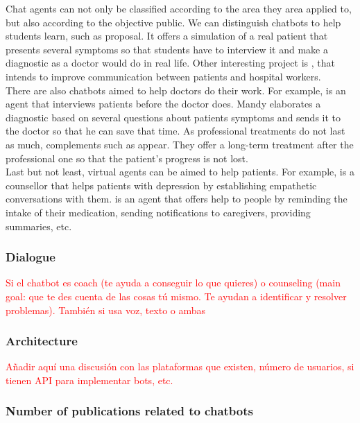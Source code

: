\documentclass[12pt,english]{article}
\begin{document}
Chat agents can not only be classified according to the area they area applied to, but also according to the objective public. We can distinguish chatbots to help students learn, such as \cite{Lopez2008194} proposal. It offers a simulation of a real patient that presents several symptoms so that students have to interview it and make a diagnostic as a doctor would do in real life. Other interesting project is \cite{Shorey2019e14658}, that intends to improve communication between patients and hospital workers.\\

There are also chatbots aimed to help doctors do their work. For example, \cite{Ni201738} is an agent that interviews patients before the doctor does. Mandy elaborates a diagnostic based on several questions about patients symptoms and sends it to the doctor so that he can save that time. As professional treatments do not last as much, complements such as \cite{DAlfonso2017} appear. They offer a long-term treatment after the professional one so that the patient's progress is not lost. \\

Last but not least, virtual agents can be aimed to help patients. For example, \cite{Harilal2020349} is a counsellor that helps patients with depression by establishing empathetic conversations with them. \cite{Roca2020954} is an agent that offers help to people by reminding the intake of their medication, sending notifications to caregivers, providing summaries, etc.


\subsubsection{Dialogue}

\textcolor{red}{Si el chatbot es coach (te ayuda a conseguir lo que quieres) o counseling (main goal: que te des cuenta de las cosas tú mismo. Te ayudan a identificar y resolver problemas). También si usa voz, texto o ambas}

\subsubsection{Architecture}

\textcolor{red}{Añadir aquí una discusión con las plataformas que existen, número de usuarios, si tienen API para implementar bots, etc.}

\subsubsection{Number of publications related to chatbots}
\end{document}
